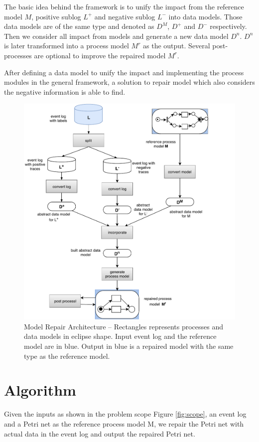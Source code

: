 The basic idea behind the framework is to unify the impact from the reference model $M$, positive sublog $L^+$ and negative sublog $L^-$ into data models. Those data models are of the same type and denoted as $D^M$, $D^+$ and $D^-$ respectively. Then we consider all impact from models and generate a new data model $D^n$. $D^n$ is later transformed into a process model $M^r$ as the output. Several post-processes are optional to improve the repaired model $M^r$.

After defining a data model to unify the impact and implementing the process modules in the general framework, a solution to repair model which also considers the negative information is able to find. 
\begin{figure}
	\includegraphics{figures/algorithm/FD_framework.pdf}
	\caption[Model Repair Architecture]{Model Repair Architecture -- \small Rectangles represents processes and data models in eclipse shape. Input event log and the reference model are in blue. Output in blue is a repaired model with the same type as the reference model.}
	\label{fig:framework}
\end{figure} 
\section{Algorithm}
Given the inputs as shown in the problem scope Figure \ref{fig:scope}, an event log and a Petri net as the reference process model M, we repair the Petri net with actual data in the event log and output the repaired Petri net. 

